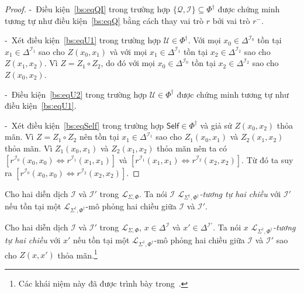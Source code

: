 \documentclass[12pt,a4paper,twoside]{report}
\newcommand{\mL}		{\mathcal{L}}
\newcommand{\mI}		{\mathcal{I}}
\newcommand{\mO}		{\mathcal{O}}
\newcommand{\mN}		{\mathcal{N}}
\newcommand{\mQ}		{\mathcal{Q}}
\newcommand{\mU}		{\mathcal{U}}
\newcommand{\SigmaDag}	{\Sigma^\dag}
\newcommand{\PhiDag}	{\Phi^\dag}
\newcommand{\Self}		{\mathsf{Self}}
\newcommand{\mLSP}		{\mL_{\Sigma,\Phi}}
\newcommand{\mLSPD}		{\mL_{\Sigma^\dag,\Phi^\dag}}
\newcommand{\semiItem}	{\mbox{- }}
\newcommand{\myend}		{\mbox{}\hfill\mbox{{\scriptsize$\!\blacksquare$}}}
\newcommand{\NickName}		{NickName}
\theoremstyle{definition}
\newtheorem{Example}{Ví dụ}[chapter]
\begin{document}
\begin{proof}
\semiItem Điều kiện~\eqref{bs:eqQI} trong trường hợp $\{\mQ, \mI\} \subseteq \PhiDag$ được chứng minh tương tự như điều kiện~\eqref{bs:eqQ} bằng cách thay vai trò $r$ bởi vai trò $r^-$.

\semiItem Xét điều kiện~\eqref{bs:eqU1} trong trường hợp $\mU \in \PhiDag$. Với mọi $x_0 \in \Delta^{\mI_0}$ tồn tại $x_1 \in \Delta^{\mI_1}$ sao cho $Z(x_0,x_1)$ và với mọi $x_1 \in \Delta^{\mI_1}$ tồn tại $x_2 \in \Delta^{\mI_2}$ sao cho $Z(x_1,x_2)$. Vì $Z=Z_1 \circ Z_2$, do đó với mọi $x_0 \in \Delta^{\mI_0}$ tồn tại $x_2 \in \Delta^{\mI_2}$ sao cho $Z(x_0,x_2)$.

\semiItem Điều kiện~\eqref{bs:eqU2} trong trường hợp $\mU \in \PhiDag$ được chứng minh tương tự như điều kiện~\eqref{bs:eqU1}.

\semiItem Xét điều kiện~\eqref{bs:eqSelf} trong trường hợp $\Self \in \PhiDag$ và giả sử $Z(x_0,x_2)$ thỏa mãn. Vì $Z = Z_1 \circ Z_2$ nên tồn tại $x_1 \in \Delta^{\mI_1}$ sao cho $Z_1(x_0,x_1)$ và $Z_2(x_1, x_2)$ thỏa mãn. Vì $Z_1(x_0,x_1)$ và $Z_2(x_1, x_2)$ thỏa mãn nên ta có $[r^{\mI_0}(x_0,x_0) \Leftrightarrow r^{\mI_1}(x_1,x_1)]$ và $[r^{\mI_1}(x_1,x_1) \Leftrightarrow r^{\mI_2}(x_2,x_2)]$. Từ đó ta suy ra $[r^{\mI_0}(x_0,x_0) \Leftrightarrow r^{\mI_2}(x_2,x_2)]$.
\end{proof}

Cho hai diễn dịch $\mI$ và $\mI'$ trong $\mLSP$. Ta nói $\mI$ {\em $\mLSPD$-tương tự hai chiều} với $\mI'$ nếu tồn tại một $\mLSPD$-mô phỏng hai chiều giữa $\mI$ và $\mI'$. 

Cho hai diễn dịch $\mI$ và $\mI'$ trong $\mLSP$, $x \in \Delta^\mI$ và $x' \in \Delta^{\mI'}$. Ta nói $x$ {\em $\mLSPD$-tương tự hai chiều} với $x'$ nếu tồn tại một $\mLSPD$-mô phỏng hai chiều giữa $\mI$ và $\mI'$ sao cho $Z(x,x')$ thỏa mãn.\footnote{\label{fn:Concept}Các khái niệm này đã được trình bày trong~\cite{Divroodi2011B,Nguyen2013,Tran2012,Ha2012,Tran2013}.}

%
\end{document}
